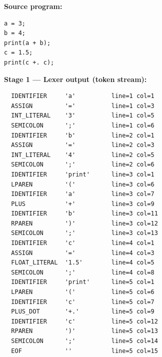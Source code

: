 \textbf{Source program:}
\begin{lstlisting}
a = 3;
b = 4;
print(a + b);
c = 1.5;
print(c +. c);
\end{lstlisting}

\textbf{Stage 1 --- Lexer output (token stream):}
\begin{lstlisting}
  IDENTIFIER     'a'          line=1 col=1
  ASSIGN         '='          line=1 col=3
  INT_LITERAL    '3'          line=1 col=5
  SEMICOLON      ';'          line=1 col=6
  IDENTIFIER     'b'          line=2 col=1
  ASSIGN         '='          line=2 col=3
  INT_LITERAL    '4'          line=2 col=5
  SEMICOLON      ';'          line=2 col=6
  IDENTIFIER     'print'      line=3 col=1
  LPAREN         '('          line=3 col=6
  IDENTIFIER     'a'          line=3 col=7
  PLUS           '+'          line=3 col=9
  IDENTIFIER     'b'          line=3 col=11
  RPAREN         ')'          line=3 col=12
  SEMICOLON      ';'          line=3 col=13
  IDENTIFIER     'c'          line=4 col=1
  ASSIGN         '='          line=4 col=3
  FLOAT_LITERAL  '1.5'        line=4 col=5
  SEMICOLON      ';'          line=4 col=8
  IDENTIFIER     'print'      line=5 col=1
  LPAREN         '('          line=5 col=6
  IDENTIFIER     'c'          line=5 col=7
  PLUS_DOT       '+.'         line=5 col=9
  IDENTIFIER     'c'          line=5 col=12
  RPAREN         ')'          line=5 col=13
  SEMICOLON      ';'          line=5 col=14
  EOF            ''           line=5 col=15
\end{lstlisting}

